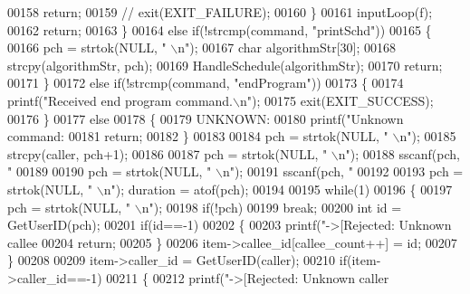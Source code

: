\begin{DoxyCode}
{{{00158             \textcolor{keywordflow}{return};
00159             \textcolor{comment}{// exit(EXIT\_FAILURE);}
00160         \}
00161         inputLoop(f);
00162         \textcolor{keywordflow}{return};
00163     \}
00164     \textcolor{keywordflow}{else} \textcolor{keywordflow}{if}(!strcmp(command, \textcolor{stringliteral}{"printSchd"}))
00165     \{
00166         pch = strtok(NULL, \textcolor{stringliteral}{" \(\backslash\)n"});
00167         \textcolor{keywordtype}{char} algorithmStr[30];
00168         strcpy(algorithmStr, pch);
00169         HandleSchedule(algorithmStr);
00170         \textcolor{keywordflow}{return};
00171     \}
00172     \textcolor{keywordflow}{else} \textcolor{keywordflow}{if}(!strcmp(command, \textcolor{stringliteral}{"endProgram"}))
00173     \{
00174         printf(\textcolor{stringliteral}{"Received end program command.\(\backslash\)n"});
00175         exit(EXIT\_SUCCESS);
00176     \}
00177     \textcolor{keywordflow}{else}
00178     \{
00179         UNKNOWN:
00180         printf(\textcolor{stringliteral}{"Unknown command: %
00181         \textcolor{keywordflow}{return};
00182     \}
00183 
00184     pch = strtok(NULL, \textcolor{stringliteral}{" \(\backslash\)n"});
00185     strcpy(caller, pch+1);
00186 
00187     pch = strtok(NULL, \textcolor{stringliteral}{" \(\backslash\)n"});
00188     sscanf(pch, \textcolor{stringliteral}{"%
00189     
00190     pch = strtok(NULL, \textcolor{stringliteral}{" \(\backslash\)n"});
00191     sscanf(pch, \textcolor{stringliteral}{"%
00192     
00193     pch = strtok(NULL, \textcolor{stringliteral}{" \(\backslash\)n"}); duration = atof(pch);
00194 
00195     \textcolor{keywordflow}{while}(1)
00196     \{
00197         pch = strtok(NULL, \textcolor{stringliteral}{" \(\backslash\)n"});
00198         \textcolor{keywordflow}{if}(!pch)
00199             \textcolor{keywordflow}{break};
00200         \textcolor{keywordtype}{int} \textcolor{keywordtype}{id} = GetUserID(pch);
00201         \textcolor{keywordflow}{if}(\textcolor{keywordtype}{id}==-1)
00202         \{
00203             printf(\textcolor{stringliteral}{"->[Rejected: Unknown callee %
00204             \textcolor{keywordflow}{return};
00205         \}
00206         item->callee\_id[callee\_count++] = id;
00207     \}
00208 
00209     item->caller\_id = GetUserID(caller);
00210     \textcolor{keywordflow}{if}(item->caller\_id==-1)
00211     \{
00212         printf(\textcolor{stringliteral}{"->[Rejected: Unknown caller %
}}}}}}}}
\end{DoxyCode}
